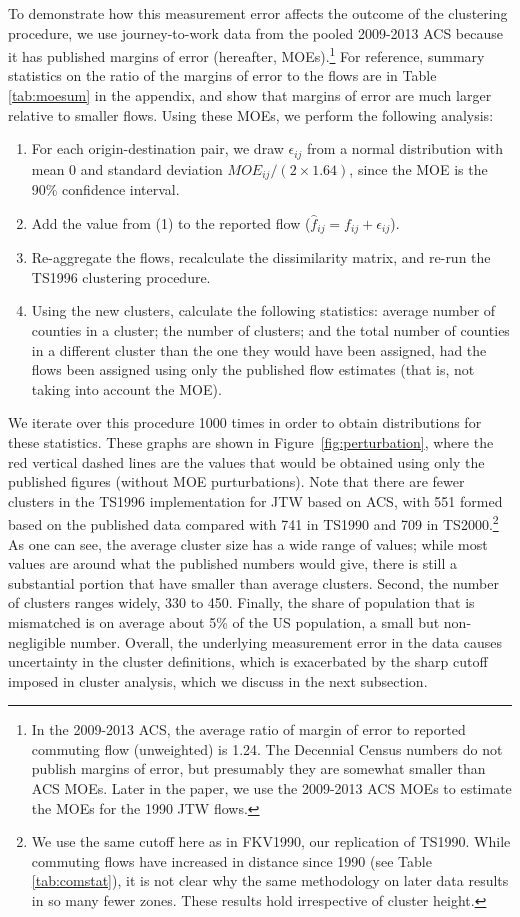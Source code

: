 To demonstrate how this measurement error affects the outcome of the clustering procedure, we use journey-to-work data from the pooled 2009-2013 ACS because it has published margins of error (hereafter, MOEs).\footnote{In the 2009-2013 ACS, the average ratio of margin of error to reported commuting flow (unweighted) is 1.24. The Decennial Census numbers do not publish margins of error, but presumably they are somewhat smaller than ACS MOEs. Later in the paper, we use the 2009-2013 ACS MOEs to estimate the MOEs for the 1990 JTW flows.} For reference, summary statistics on the ratio of the margins of error to the flows are in Table \ref{tab:moesum} in the appendix, and show that margins of error are much larger relative to smaller flows. Using these MOEs, we perform the following analysis: 

\begin{enumerate}
	\item For each origin-destination pair, we draw $\epsilon_{ij}$ from a normal distribution
 with mean 0 and standard deviation $MOE_{ij}/(2 \times 1.64)$, since the MOE is the 90\% confidence interval.
	\item Add the value from (1) to the reported flow ($\hat{f}_{ij} = f_{ij} + \epsilon_{ij}$).
	\item Re-aggregate the flows, recalculate the dissimilarity matrix, and re-run the TS1996 clustering procedure.
	\item Using the new clusters, calculate the following statistics: average number of counties in a cluster; the number of clusters; and the total number of counties in a different cluster than the one they would have been assigned, had the flows been assigned using only the published flow estimates (that is, not taking into account the MOE).
\end{enumerate}
%

%
We iterate over this procedure 1000 times in order to obtain distributions for these statistics. These graphs are shown in Figure~\ref{fig:perturbation}, where the red vertical dashed lines are the values that would be obtained using only the published figures (without MOE purturbations). Note that there are fewer clusters in the TS1996 implementation for JTW based on ACS, with 551 formed based on the published data compared with 741 in TS1990 and 709 in TS2000.\footnote{We use the same cutoff here as in FKV1990, our replication of TS1990. While commuting flows have increased in distance since 1990 (see Table \ref{tab:comstat}), it is not clear why the same methodology on later data results in so many fewer zones. These results hold irrespective of cluster height.} As one can see, the average cluster size has a wide range of values; while most values are around what the published numbers would give, there is still a substantial portion that have smaller than average clusters. Second, the number of clusters ranges widely, 330 to 450. Finally, the share of population that is mismatched is on average about 5\% of the US population, a small but non-negligible number.
Overall, the underlying measurement error in the data causes uncertainty in the cluster definitions, which is exacerbated by the sharp cutoff imposed in cluster analysis, which we discuss in the next subsection.

